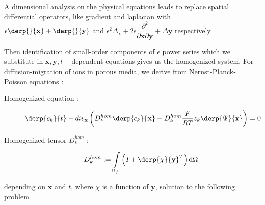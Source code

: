 \par
A dimensional analysis on the physical equations leads to replace spatial differential operators, like gradient and laplacian with %
$\epsilon\derp{}{\mathbf{x}}+\derp{}{\mathbf{y}}$ and $\epsilon^2\Delta_{\mathbf{x}}+2\epsilon \dfrac{\partial^2}{\partial{\mathbf{x}}\partial{\mathbf{y}}} +\Delta{\mathbf{y}}$ respectively.

\par
Then identification of small-order components of $\epsilon$ power series which we substitute in $\mathbf{x},\mathbf{y},t-$dependent equations gives us the homogenized system. %
For diffusion-migration of ions in porous media, we derive from Nernst-Planck-Poisson equations :

\begin{description}
\item[Homogenized equation :] %
\[\derp{c_k}{t}-div_{\mathbf{x}}\left(D_k^{hom}\derp{c_k}{\mathbf{x}}+D_k^{hom}\frac{F}{RT}z_k \derp{\Psi}{\mathbf{x}}\right)=0\]
\item[Homogenized tensor $D_k^{hom}$ :] 
\[D_k^{hom}:=\int\limits_{\Omega_f}\left(I+\derp{\chi}{\mathbf{y}}^T\right)\text{d}\Omega\]
\end{description}

depending on $\mathbf{x}$ and $t$, %
where $\chi$ is a function of $\mathbf{y}$, %
solution to the following problem.

\begin{comment}
\begin{rema}
In this paragraph we have skipped adimensionalization of the physical equations, which is prior to asymptotical analysis. %
Anyway, if doesn't change the general idea of the proof.
\end{rema}
\end{comment}

